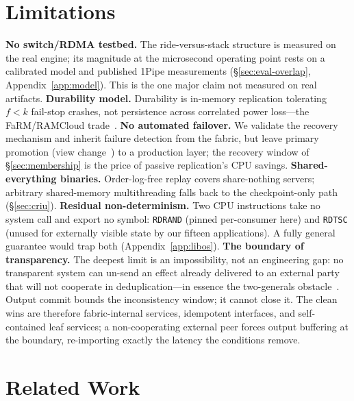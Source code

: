 \section{Limitations}
\label{sec:limits}

\textbf{No switch/RDMA testbed.} The ride-versus-stack structure is
measured on the real engine; its magnitude at the microsecond operating
point rests on a calibrated model and published 1Pipe measurements
(\S\ref{sec:eval-overlap}, Appendix~\ref{app:model}). This is the one
major claim not measured on real artifacts.
\textbf{Durability model.} Durability is in-memory replication tolerating
$f<k$ fail-stop crashes, not persistence across correlated power
loss---the FaRM/RAMCloud trade~\citep{dragojevic2014farm}.
\textbf{No automated failover.} We validate the recovery mechanism and
inherit failure detection from the fabric, but leave primary promotion
(view change~\citep{oki1988vr,liskov2012vrrevisited}) to a production
layer; the recovery window of \S\ref{sec:membership} is the price of
passive replication's CPU savings.
\textbf{Shared-everything binaries.} Order-log-free replay covers
share-nothing servers; arbitrary shared-memory multithreading falls back
to the checkpoint-only path (\S\ref{sec:criu}).
\textbf{Residual non-determinism.} Two CPU instructions take no system
call and export no symbol: \texttt{RDRAND} (pinned per-consumer here) and
\texttt{RDTSC} (unused for externally visible state by our fifteen
applications). A fully general guarantee would trap both
(Appendix~\ref{app:libos}).
\textbf{The boundary of transparency.} The deepest limit is an
impossibility, not an engineering gap: no transparent system can un-send
an effect already delivered to an external party that will not cooperate
in deduplication---in essence the two-generals
obstacle~\citep{gray1978notes}. Output commit bounds the inconsistency
window; it cannot close it. The clean wins are therefore fabric-internal
services, idempotent interfaces, and self-contained leaf services; a
non-cooperating external peer forces output buffering at the boundary,
re-importing exactly the latency the conditions remove.

\section{Related Work}
\label{sec:related}

